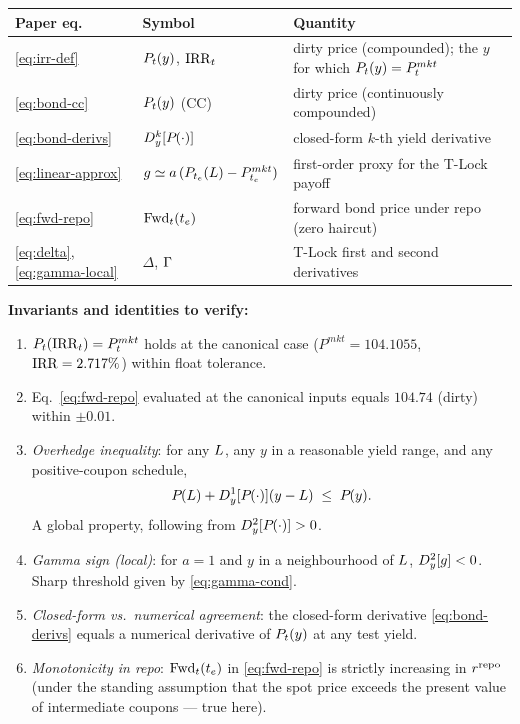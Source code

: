 \documentclass[11pt,a4paper]{article}
\begin{document}
\begin{validation}
\smallskip
\begin{tabular}{@{}p{2.8cm}p{3.8cm}p{6.2cm}@{}}
\toprule
Paper eq.                                     & Symbol                                             & Quantity \\
\midrule
\eqref{eq:irr-def}                            & $P_{t}(y)$, $\mathrm{IRR}_t$                            & dirty price (compounded); the $y$ for which $P_{t}(y)=P^{mkt}_t$ \\
\eqref{eq:bond-cc}                            & $P_{t}(y)$ (CC)                                 & dirty price (continuously compounded) \\
\eqref{eq:bond-derivs}                        & $D_{y}^{k}[P_{}(\cdot)]$                      & closed-form $k$-th yield derivative \\
\eqref{eq:linear-approx}                      & $g \simeq a\,(P_{t_e}(L) - P^{mkt}_{t_e})$  & first-order proxy for the T-Lock payoff \\
\eqref{eq:fwd-repo}                           & $\mathrm{Fwd}_{t}(t_e)$                                   & forward bond price under repo (zero haircut) \\
\eqref{eq:delta},\eqref{eq:gamma-local}       & $\Delta$, $\Gamma$                                   & T-Lock first and second derivatives \\
\bottomrule
\end{tabular}
\smallskip

\textbf{Invariants and identities to verify:}
\begin{enumerate}[noitemsep]
  \item $P_{t}(\mathrm{IRR}_t) = P^{mkt}_t$ holds at the canonical case
        ($P^{mkt} = 104.1055$, $\mathrm{IRR} = 2.717\%$) within float tolerance.
  \item Eq.~\eqref{eq:fwd-repo} evaluated at the canonical inputs equals
        $104.74$ (dirty) within $\pm 0.01$.
  \item \emph{Overhedge inequality}: for any $L$, any $y$ in a
        reasonable yield range, and any positive-coupon schedule,
        \[
          P_{}(L) + D_{y}^{1}[P_{}(\cdot)](y - L) \;\le\; P_{}(y).
        \]
        A global property, following from $D_{y}^{2}[P_{}(\cdot)] > 0$.
  \item \emph{Gamma sign (local)}: for $a=1$ and $y$ in a neighbourhood
        of $L$, $D_{y}^{2}[g] < 0$. Sharp threshold given by
        \eqref{eq:gamma-cond}.
  \item \emph{Closed-form vs.\ numerical agreement}: the closed-form
        derivative \eqref{eq:bond-derivs} equals a numerical derivative
        of $P_{t}(y)$ at any test yield.
  \item \emph{Monotonicity in repo}: $\mathrm{Fwd}_{t}(t_e)$ in
        \eqref{eq:fwd-repo} is strictly increasing in $r^{\mathrm{repo}}$ (under
        the standing assumption that the spot price exceeds the present
        value of intermediate coupons --- true here).
\end{enumerate}
\end{validation}
\end{document}
